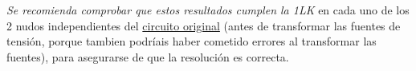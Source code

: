 \documentclass[10pt]{article}
\begin{document}
\vspace{4mm}

\emph{Se recomienda comprobar que estos resultados cumplen la 1LK} en cada uno de los 2 nudos independientes del \underline{circuito original} (antes de transformar las fuentes de tensión, porque tambien podríais haber cometido errores al transformar las fuentes), para asegurarse de que la resolución es correcta.
\end{document}
